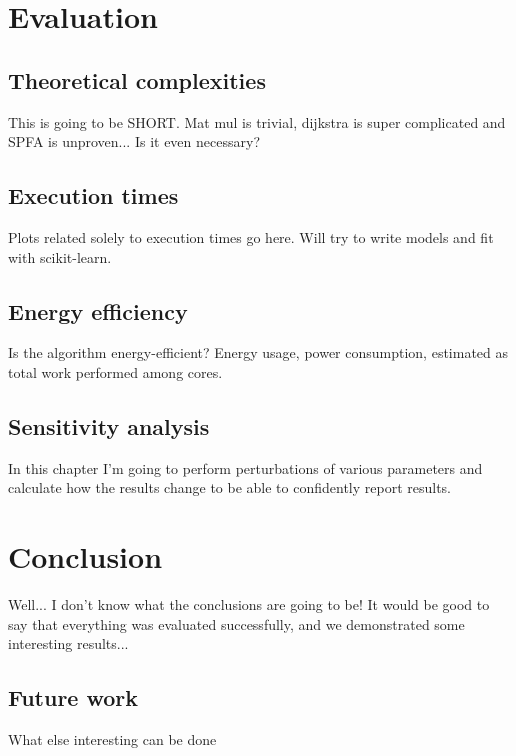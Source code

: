 \documentclass[12pt,a4paper,twoside,openright]{report}
\begin{document}
\chapter{Evaluation}
\section{Theoretical complexities}
This is going to be SHORT. Mat mul is trivial, dijkstra is super complicated and SPFA is unproven... Is it even necessary? 

\section{Execution times}
Plots related solely to execution times go here. Will try to write models and fit with scikit-learn.

\section{Energy efficiency}
Is the algorithm energy-efficient? Energy usage, power consumption, estimated as total work performed among cores.

\section{Sensitivity analysis}
In this chapter I'm going to perform perturbations of various parameters and calculate how the results change to be able to confidently report results.

\chapter{Conclusion}

Well... I don't know what the conclusions are going to be! It would be good to say that everything was evaluated successfully, and we demonstrated some interesting results... 

\section{Future work}
What else interesting can be done

\printbibliography
\end{document}
